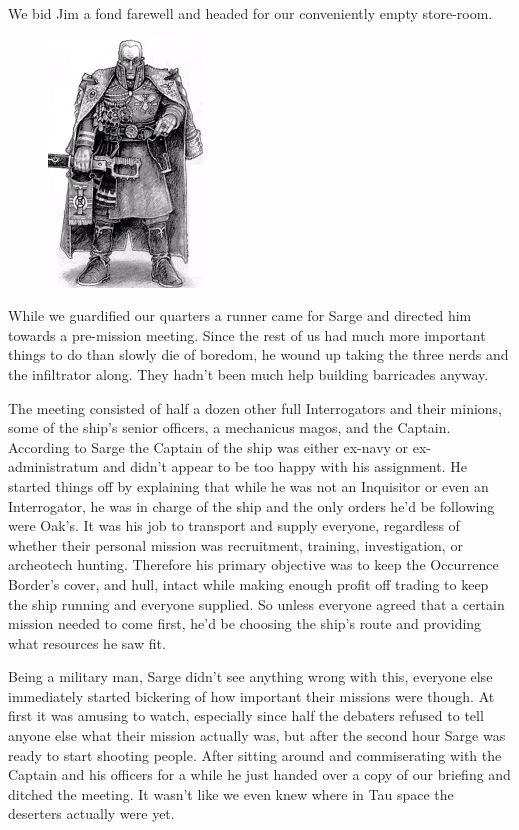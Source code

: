 We bid Jim a fond farewell and headed for our conveniently empty store-room.

\begin{figure}
	\begin{center}
		\includegraphics[width=\figwidth]{pics/10/8.png}
	\end{center}
\end{figure}
While we guardified our quarters a runner came for Sarge and directed him towards a pre-mission meeting. 
Since the rest of us had much more important things to do than slowly die of boredom, he wound up taking the three nerds and the infiltrator along. 
They hadn't been much help building barricades anyway.

The meeting consisted of half a dozen other full Interrogators and their minions, some of the ship's senior officers, a mechanicus magos, and the Captain. 
According to Sarge the Captain of the ship was either ex-navy or ex-administratum and didn't appear to be too happy with his assignment. 
He started things off by explaining that while he was not an Inquisitor or even an Interrogator, he was in charge of the ship and the only orders he'd be following were Oak's. 
It was his job to transport and supply everyone, regardless of whether their personal mission was recruitment, training, investigation, or archeotech hunting. 
Therefore his primary objective was to keep the Occurrence Border's cover, and hull, intact while making enough profit off trading to keep the ship running and everyone supplied. 
So unless everyone agreed that a certain mission needed to come first, he'd be choosing the ship's route and providing what resources he saw fit.

Being a military man, Sarge didn't see anything wrong with this, everyone else immediately started bickering of how important their missions were though. 
At first it was amusing to watch, especially since half the debaters refused to tell anyone else what their mission actually was, but after the second hour Sarge was ready to start shooting people. 
After sitting around and commiserating with the Captain and his officers for a while he just handed over a copy of our briefing and ditched the meeting. 
It wasn't like we even knew where in Tau space the deserters actually were yet.

